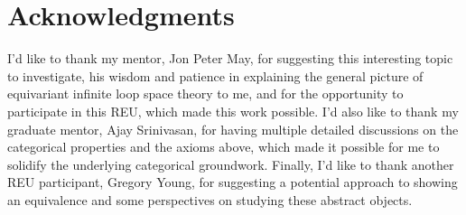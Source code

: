\documentclass[openany, amssymb, psamsfonts]{amsart}
\theoremstyle{definition}
\numberwithin{equation}{section}
\begin{document}
\section*{Acknowledgments}  

I'd like to thank my mentor, Jon Peter May, for suggesting this interesting topic to investigate, his wisdom and patience in explaining the general picture of equivariant infinite loop space theory to me, and for the opportunity to participate in this REU, which made this work possible. I'd also like to thank my graduate mentor, Ajay Srinivasan, for having multiple detailed discussions on the categorical properties and the axioms above, which made it possible for me to solidify the underlying categorical groundwork. Finally, I'd like to thank another REU participant, Gregory Young, for suggesting a potential approach to showing an equivalence and some perspectives on studying these abstract objects. 
\end{document}
